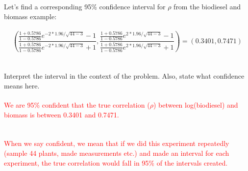 Let's find a corresponding 95\% confidence interval for $\rho$ from the biodiesel and biomass example: \\~\\
$$\left(\frac{\frac{1+0.5786}{1-0.5786}e^{-2*1.96/\sqrt{44-3}}-1}{\frac{1+0.5786}{1-0.5786}e^{-2*1.96/\sqrt{44-3}}+1}, \frac{\frac{1+0.5786}{1-0.5786}e^{2*1.96/\sqrt{44-3}}-1}{\frac{1+0.5786}{1-0.5786}e^{2*1.96/\sqrt{44-3}}+1}\right) = (0.3401, 0.7471)$$~\\~\\
Interpret the interval in the context of the problem.  Also, state what confidence means here.
\textcolor{red}{\\~\\
We are 95\% confident that the true correlation ($\rho$) between log(biodiesel) and biomass is between 0.3401 and 0.7471.\\~\\~\\
When we say confident, we mean that if we did this experiment repeatedly (sample 44 plants, made measurements etc.) and made an interval for each experiment, the true correlation would fall in 95\% of the intervals created.}

\newpage

